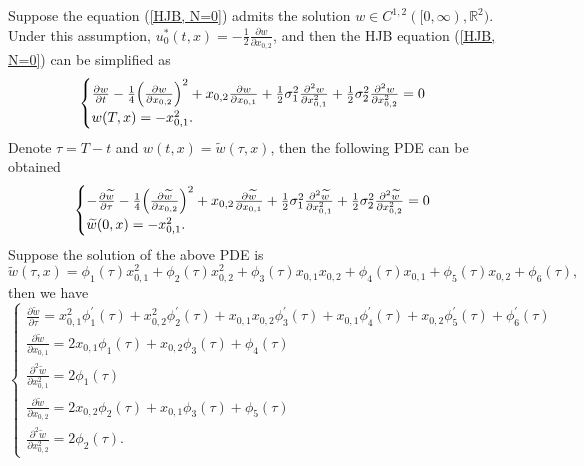 \documentclass{article}
\begin{document}
Suppose the equation (\ref{HJB, N=0}) admits the solution $w \in C^{1, 2}([0, \infty), \mathbb{R}^{2})$. Under this assumption, $u_{0}^{*}(t, x) = - \frac{1}{2} \frac{\partial w}{\partial x_{0, 2}}$, and then the HJB equation (\ref{HJB, N=0}) can be simplified as
\begin{equation*} 
    \begin{cases}
   \frac{\partial w}{\partial t} -  \frac{1}{4} \Big{(} \frac{\partial w}{\partial x_{0, 2}} \Big{)}^{2} + x_{0,2} \frac{\partial w}{\partial x_{0, 1}}  + \frac{1}{2} \sigma_{1}^{2} \frac{\partial^{2} w}{\partial x_{0, 1}^{2}} + \frac{1}{2} \sigma_{2}^{2} \frac{\partial^{2} w}{\partial x_{0, 2}^{2}} = 0  \\
   w(T, x) = - x_{0, 1}^{2}.
   \end{cases}
\end{equation*}
Denote $\tau = T-t$ and $w(t, x) = \widetilde{w}(\tau, x)$, then the following PDE can be obtained
\begin{equation*}
    \begin{cases}
   - \frac{\partial \widetilde{w}}{\partial \tau} -  \frac{1}{4} \Big{(} \frac{\partial \widetilde{w}}{\partial x_{0, 2}} \Big{)}^{2} + x_{0,2} \frac{\partial \widetilde{w}}{\partial x_{0, 1}}  + \frac{1}{2} \sigma_{1}^{2} \frac{\partial^{2} \widetilde{w}}{\partial x_{0, 1}^{2}} + \frac{1}{2} \sigma_{2}^{2} \frac{\partial^{2} \widetilde{w}}{\partial x_{0, 2}^{2}} = 0  \\
   \widetilde{w}(0, x) = - x_{0, 1}^{2}.
   \end{cases}
\end{equation*}
Suppose the solution of the above PDE is
\begin{equation}
    \widetilde{w}(\tau, x) = \phi_{1}(\tau) x_{0, 1}^{2} + \phi_{2}(\tau) x_{0, 2}^{2} + \phi_{3}(\tau) x_{0, 1} x_{0, 2} + \phi_{4}(\tau) x_{0, 1} + \phi_{5}(\tau) x_{0, 2} + \phi_{6} (\tau),
\end{equation}
then we have
\begin{equation*}
    \begin{cases}
   \frac{\partial \widetilde{w}}{\partial \tau} = x_{0, 1}^{2} \phi_{1}^{'} (\tau) + x_{0, 2}^{2} \phi_{2}^{'} (\tau) + x_{0, 1} x_{0, 2} \phi_{3}^{'} (\tau) + x_{0, 1} \phi_{4}^{'} (\tau) + x_{0, 2} \phi_{5}^{'} (\tau) + \phi_{6}^{'} (\tau) \\
   \frac{\partial \widetilde{w}}{\partial x_{0, 1}} = 2 x_{0, 1} \phi_{1} (\tau) + x_{0, 2} \phi_{3}(\tau) + \phi_{4}(\tau) \\
   \frac{\partial^{2} \widetilde{w}}{\partial x_{0, 1}^{2}} = 2 \phi_{1}(\tau) \\
   \frac{\partial \widetilde{w}}{\partial x_{0, 2}} = 2 x_{0, 2} \phi_{2} (\tau) + x_{0, 1} \phi_{3}(\tau) + \phi_{5}(\tau) \\
   \frac{\partial^{2} \widetilde{w}}{\partial x_{0, 2}^{2}} = 2 \phi_{2}(\tau).
   \end{cases}
\end{equation*}
\end{document}
